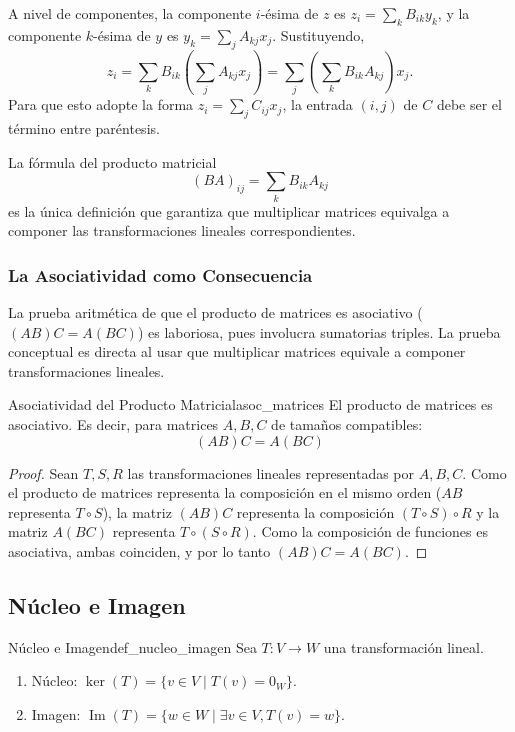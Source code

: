 \documentclass[11pt, a4paper]{article}
\begin{document}
A nivel de componentes, la componente $i$-ésima de $z$ es $z_i = \sum_{k} B_{ik} y_k$, y la componente $k$-ésima de $y$ es $y_k = \sum_{j} A_{kj} x_j$. Sustituyendo,
\[ z_i = \sum_{k} B_{ik} \left( \sum_{j} A_{kj} x_j \right) = \sum_{j} \left( \sum_{k} B_{ik} A_{kj} \right) x_j. \]
Para que esto adopte la forma $z_i = \sum_{j} C_{ij} x_j$, la entrada $(i, j)$ de $C$ debe ser el término entre paréntesis.

\obs
La fórmula del producto matricial
\[ (BA)_{ij} = \sum_{k} B_{ik} A_{kj} \]
es la única definición que garantiza que multiplicar matrices equivalga a componer las transformaciones lineales correspondientes.

\subsubsection{La Asociatividad como Consecuencia}

La prueba aritmética de que el producto de matrices es asociativo ($(AB)C = A(BC)$) es laboriosa, pues involucra sumatorias triples. La prueba conceptual es directa al usar que multiplicar matrices equivale a componer transformaciones lineales.

\begin{proposicion}{Asociatividad del Producto Matricial}{asoc_matrices}
El producto de matrices es asociativo. Es decir, para matrices $A, B, C$ de tamaños compatibles:
\[ (AB)C = A(BC) \]
\end{proposicion}

\begin{proof}
Sean $T, S, R$ las transformaciones lineales representadas por $A, B, C$. Como el producto de matrices representa la composición en el mismo orden ($AB$ representa $T \circ S$), la matriz $(AB)C$ representa la composición $(T \circ S) \circ R$ y la matriz $A(BC)$ representa $T \circ (S \circ R)$. Como la composición de funciones es asociativa, ambas coinciden, y por lo tanto $(AB)C = A(BC)$.
\end{proof}

\subsection{Núcleo e Imagen}

\begin{definicion}{Núcleo e Imagen}{def_nucleo_imagen}
Sea $T: V \to W$ una transformación lineal.
\begin{enumerate}
    \item Núcleo: $\ker(T) = \{v \in V \mid T(v) = 0_W\}$.
    \item Imagen: $\operatorname{Im}(T) = \{w \in W \mid \exists v \in V, T(v) = w\}$.
\end{enumerate}
\end{definicion}
\end{document}
